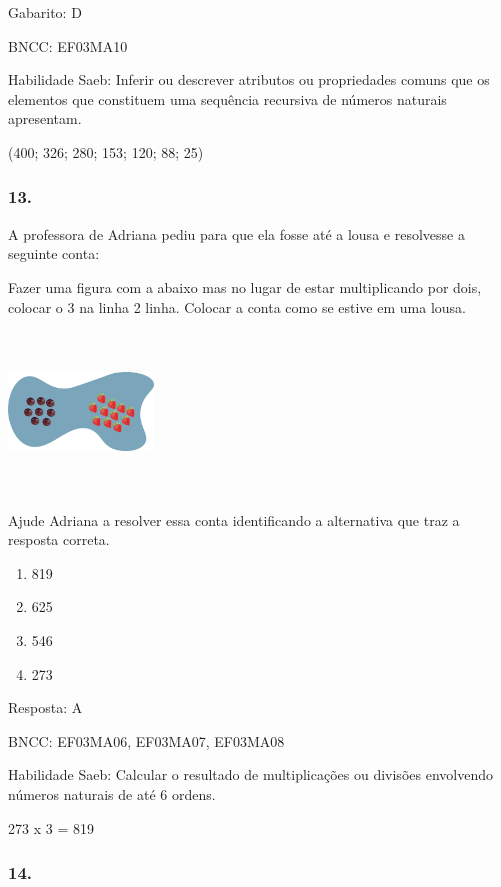 Gabarito: D

BNCC: EF03MA10

Habilidade Saeb: Inferir ou descrever atributos ou propriedades comuns
que os elementos que constituem uma sequência recursiva de números
naturais apresentam.

(400; 326; 280; 153; 120; 88; 25)

\subsubsection{13.}\label{section-138}

A professora de Adriana pediu para que ela fosse até a lousa e
resolvesse a seguinte conta:

Fazer uma figura com a abaixo mas no lugar de estar multiplicando por
dois, colocar o 3 na linha 2 linha. Colocar a conta como se estive em
uma lousa.

\includegraphics[width=1.51680in,height=1.67515in]{media/image114.png}

Ajude Adriana a resolver essa conta identificando a alternativa que traz
a resposta correta.

\begin{enumerate}
\def\labelenumi{\alph{enumi})}
\item
  819
\item
  625
\item
  546
\item
  273
\end{enumerate}

Resposta: A

BNCC: EF03MA06, EF03MA07, EF03MA08

Habilidade Saeb: Calcular o resultado de multiplicações ou divisões
envolvendo números naturais de até 6 ordens.

273 x 3 = 819

\subsubsection{14.}\label{section-139}

